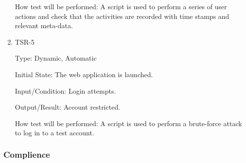 \documentclass[12pt, titlepage]{article}
\begin{document}
\begin{enumerate}
How test will be performed: A script is used to perform a series of user actions and check that the activities are recorded with time stamps and relevant meta-data.

\item{TSR-5\\}\label{TSR-5}

Type: Dynamic, Automatic
					
Initial State: The web application is launched.
					
Input/Condition: Login attempts.
					
Output/Result: Account restricted.
					
How test will be performed: A script is used to perform a brute-force attack to log in to a test account.
\end{enumerate}

\subsubsection{Complience}
\end{document}
